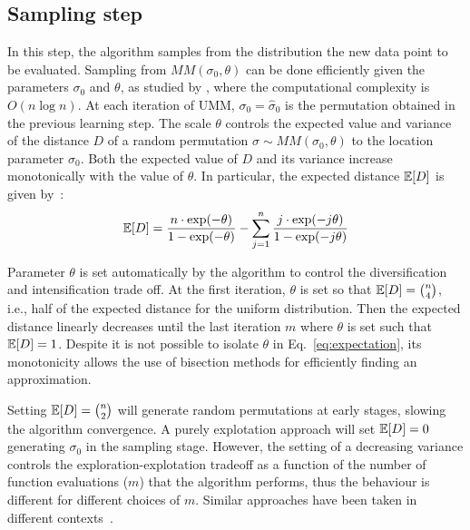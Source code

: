 \documentclass[sigconf,dvipsnames]{acmart}
\begin{document}

\subsection{Sampling step}\label{sec:sampling}
In this step, the algorithm samples from the distribution the new data point to be evaluated. 
Sampling from $MM(\sigma_0,\theta)$  can be done efficiently given the parameters  $\sigma_0$ and $\theta$, as studied by \citet{IruCalLoz2016permallows}, where the computational complexity is $O(n\log n)$. %
%
At each iteration of UMM, $\sigma_0=\hat\sigma_0$ is the permutation obtained in the previous learning step. The scale $\theta$ controls the expected value and variance of the distance $D$ of a random permutation $\sigma\sim MM(\sigma_0, \theta)$ to the location parameter $\sigma_0$. Both  the expected value of $D$ and its variance increase monotonically with the value of $\theta$. In particular, the expected distance $\mathbb{E}[D]$ is given by~\cite{FliVer1986}:
%
\begin{equation}\label{eq:expectation}
\mathbb{E}[D] = \frac{n \cdot \exp(-\theta)}{1-\exp(-\theta)} - \sum_{j=1}^{n}  \frac{j\cdot\exp(-j  \theta)}{1-\exp(-j\theta)}
\end{equation}

Parameter $\theta$ is set automatically by the algorithm to control the diversification and intensification trade off. At the first iteration, $\theta$ is set so that  $\mathbb{E}[D] = \binom{n}{4}$, i.e., half of the expected distance for the uniform distribution. 
Then the expected distance linearly decreases until the last iteration $m$ where $\theta$ is set such that $\mathbb{E}[D] = 1$. Despite it is not possible to isolate $\theta$ in Eq.~\eqref{eq:expectation}, its monotonicity allows the use of bisection methods for efficiently finding an approximation. 

Setting $\mathbb{E}[D] = \binom{n}{2}$ will generate random permutations at early stages, slowing the algorithm convergence. 
A purely explotation approach will set $\mathbb{E}[D] = 0$  generating $\sigma_0$ in the sampling stage. However, the setting of a decreasing variance   controls the exploration-explotation tradeoff as a function of the number of function evaluations ($m$) that the algorithm performs, thus the behaviour is different for different choices of $m$. Similar approaches have been taken in different contexts~\cite{ArzCebPer2019qap}. 
\end{document}
